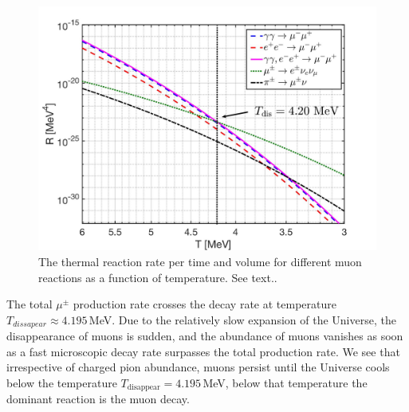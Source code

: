  
\begin{figure}
\centerline{\includegraphics[width=0.9\linewidth]{./plots/MuonRate_new2.jpg}}
\caption{The thermal reaction rate per time and volume for different muon reactions as a function of temperature. See text.. }
\label{MuonRatenew:fig} 
\end{figure}

The total $\mu^\pm$ production rate crosses the decay rate at temperature $T_{dissapear}\approx 4.195$\,MeV. Due to the relatively slow expansion of the Universe, the disappearance of muons is sudden, and the abundance of muons vanishes as soon as a fast microscopic decay rate surpasses the total production rate. We see that irrespective of charged pion abundance, muons persist until the Universe cools below the temperature $T_\mathrm{disappear}=4.195$\,MeV, below that temperature the dominant reaction is the muon decay.


